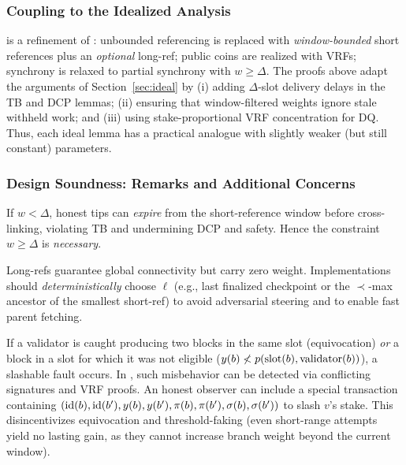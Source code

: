 \subsubsection{Coupling to the Idealized Analysis}
\label{subsec:base-coupling}
\ProjBase is a refinement of \ProjIdeal: unbounded referencing is replaced with \emph{window-bounded} short references plus an \emph{optional} long-ref; public coins are realized with VRFs; synchrony is relaxed to partial synchrony with $w\ge \Delta$. The proofs above adapt the arguments of Section~\ref{sec:ideal} by (i) adding $\Delta$-slot delivery delays in the TB and DCP lemmas; (ii) ensuring that window-filtered weights ignore stale withheld work; and (iii) using stake-proportional VRF concentration for DQ. Thus, each ideal lemma has a practical analogue with slightly weaker (but still constant) parameters.

\subsubsection{Design Soundness: Remarks and Additional Concerns}
\label{subsec:base-remarks}
\begin{remark}
If $w<\Delta$, honest tips can \emph{expire} from the short-reference window before cross-linking, violating TB and undermining DCP and safety. Hence the constraint $w\ge \Delta$ is \emph{necessary}.
\end{remark}

\begin{remark}
Long-refs guarantee global connectivity but carry zero weight. Implementations should \emph{deterministically} choose $\ell$ (e.g., last finalized checkpoint or the $\prec$-max ancestor of the smallest short-ref) to avoid adversarial steering and to enable fast parent fetching.
\end{remark}

\begin{remark}
If a validator is caught producing two blocks in the same slot (equivocation) \emph{or} a block in a slot for which it was not eligible ($y(b)\not< p(\mathrm{slot}(b),\mathrm{validator}(b))$), a slashable fault occurs. In \ProjBase, such misbehavior can be detected via conflicting signatures and VRF proofs. An honest observer can include a special transaction containing $(\mathrm{id}(b),\mathrm{id}(b'),y(b),y(b'),\pi(b),\pi(b'),\sigma(b),\sigma(b'))$ to slash $v$'s stake. This disincentivizes equivocation and threshold-faking (even short-range attempts yield no lasting gain, as they cannot increase branch weight beyond the current window).
\end{remark}

